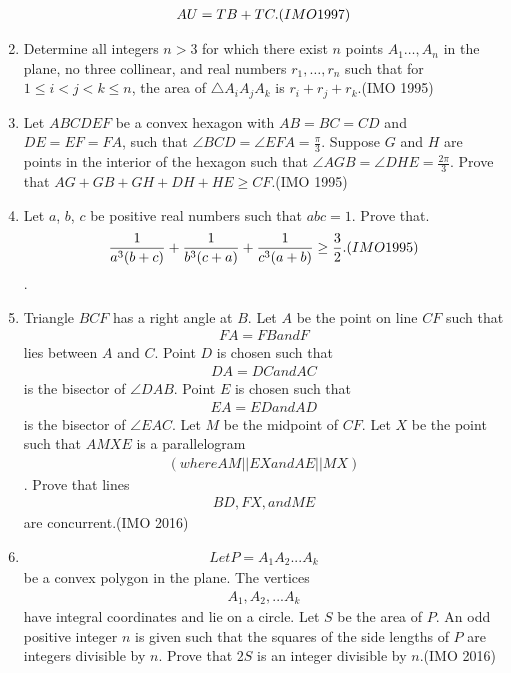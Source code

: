 \begin{enumerate}
 \begin{align}
AU=TB+TC.\hfill(IMO 1997)
 \end{align}                                   
\item Determine all integers $n>3$ for which there exist $n$ points $A_1\dots,A_n$ in the plane, no three collinear, and real numbers $r_1,\dots,r_n$ such that for $1\leq{i}<{j}<{k}\leq{n}$, the area of $\triangle A_iA_jA_k$ is $r_i+r_j+r_k$.\hfill(IMO 1995)
\item Let $ABCDEF$ be a convex hexagon with $AB=BC=CD$ and $DE=EF=FA$, such that $\angle{BCD}=\angle{EFA}=\frac{\pi}{3}$. Suppose $G$ and $H$ are points in the interior of the hexagon such that $\angle{AGB}=\angle{DHE}=\frac{2\pi}{3}$. Prove that $AG+GB+GH+DH+HE\geq CF$.\hfill (IMO 1995)
\item Let $a$, $b$, $c$ be positive real numbers such that $abc=1$. Prove that.
\begin{align}
\frac{1}{a^3(b+c)}+\frac{1}{b^3(c+a)}+\frac{1}{c^3(a+b)}\geq\frac{3}{2}.\hfill(IMO 1995)
 \end{align}.
 \item Triangle $BCF$ has a right angle at $B$. Let $A$ be the point on line $CF$ such that \begin{align}FA=FB and F\end{align} lies between $A$ and $C$. Point $D$ is chosen such that \begin{align}DA = DC and AC\end{align} is the bisector of $\angle DAB.$ Point $E$ is chosen such that \begin{align}EA= ED and AD\end{align} is the bisector of $\angle EAC$. Let $M$ be the midpoint of $CF$. Let $X$ be the point such that $AMXE$ is a parallelogram \begin{align}(where AM || EX and AE || MX)\end{align}. Prove that lines \begin{align}BD, FX, and ME\end{align} are concurrent.\hfill (IMO 2016)
\item \begin{align}Let P=A_1A_2... A_k\end{align} be a convex polygon in the plane. The vertices \begin{align}A_1, A_2,... A_k \end{align} have integral coordinates and lie on a circle. Let $S$ be the area of $P$. An odd positive integer $n$ is given such that the squares of the side lengths of $P$ are integers divisible by $n$. Prove that $2S$ is an integer divisible by $n$.\hfill(IMO 2016)

\end{enumerate}
